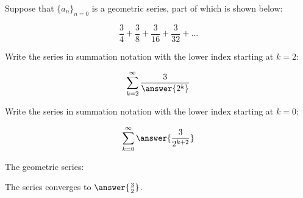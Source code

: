 \documentclass{ximera}
\author{Jim Talamo}
\begin{document}
\begin{exercise}
Suppose that $\{a_n\}_{n=0}$ is a geometric series, part of which is shown below:

\[
\frac{3}{4} + \frac{3}{8} + \frac{3}{16} + \frac{3}{32} + \ldots
\]

Write the series in summation notation with the lower index starting at $k=2$:

\[
\sum_{k=2}^{\infty} \frac{3}{\answer{2^k}}
\]

Write the series in summation notation with the lower index starting at $k=0$:

\[
\sum_{k=0}^{\infty} \answer{\frac{3}{2^{k+2}}}
\]

\begin{exercise}
The geometric series:

\begin{multipleChoice}
\end{multipleChoice}

\begin{exercise}
The series converges to $\answer{\frac{3}{2}}$.
\end{exercise}
\end{exercise}
\end{exercise}
\end{document}
